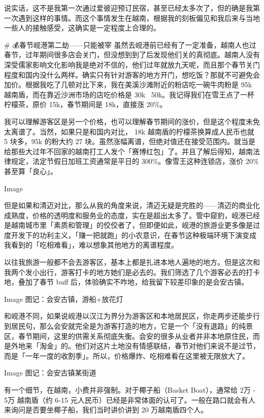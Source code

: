 说实话，这不是我第一次通过爱彼迎预订民宿，甚至已经太多次了，但的确是我第一次遇到这样的事情。而这个事情发生在越南，根据我的刻板偏见和我后来与当地一些人的接触感受，这确实是一定程度上合理的。

# 💰春节岘港第二劫——只能被宰
虽然去岘港前已经有了一定准备，越南人也过春节，过年期间很多店会关门，但没想到到了后发现他们关的真彻底。越南人没有深受儒家影响文化影响我是绝对不信的，他们过年就放九天呢，而且那个春节关门程度和国内没什么两样。确实只有针对游客的地方开门，想吃饭？那就不可避免会加价。根据我吃了几顿对比下来，我在美溪沙滩附近的粉店吃一碗牛肉粉是 95k 越南盾，而在靠近沙洲市场的店吃价格是 30k ~50k。我记得我们在雪王点了一杯柠檬茶，原价 15k，春节期间是 18k，直接涨 20\%。

我可以理解游客区是另一个价格，也可以理解春节期间的涨价，但是这个程度未免太离谱了。当然，如果只是和国内对比， 18k 越南盾的柠檬茶换算成人民币也就 5 块多，95k 的粉大约 27 块。虽然涨幅离谱，但绝对值还在接受范围内。就当是给那些大过年不回家的越南打工人发个「赛博红包」了。并且了解后得知，越南法律规定，法定节假日加班工资通常是平日的 300\%。像雪王这种连锁店，涨价 20\% 甚至算「良心」。

Image

但是如果和清迈对比，那么从我的角度来说，清迈无疑是完胜的——清迈的商业化成熟度，价格的透明度和服务业的态度，实在是超出太多了。管中窥豹，岘港已经是越南城市里「素质和管理」的佼佼者了，但即便如此，岘港的旅游业更多像是过度开发下的功利主义，「赚一把就跑」的小农意识，在春节这种极端环境下演变成我看到的「吃相难看」，难以想象其他地方的离谱程度。

以往我旅游一般都不会去游客区，基本上都是扎进本地人遍地的地方。但是这次和我两个发小出行，游客打卡的地方她们是必去的。我们筛选了几个游客必去的打卡地，叠加了春节 buff 后，体验确实不咋地，给我留下较差印象的是会安古镇。

Image
图记：会安古镇，游船+放花灯

和岘港不同，如果说岘港以汉江为界分为游客区和本地居民区，你走两步还能步行到居民句，那么会安就完全是为游客打造的地方，它是一个「没有退路」的纯景区，春节期间，这里的供需关系彻底失衡。会安的很多从业者并非本地原住民，而是外地来「淘金」的。他们对这片土地没有情感联结，春节对他们来说不是过节，而是「一年一度的收割季」。所以，价格爆炸、吃相难看在这里被无限放大了。

Image
图记：会安古镇某街道

有一个细节，在越南，小费并非强制。对于椰子船（Basket Boat），通常给 2万 - 5万 越南盾（约 6-15 元人民币）已经是非常体面的认可了。一般在路口就会有人来询问是否要坐椰子船，我们当时讲价讲到 20 万越南盾四个人。

